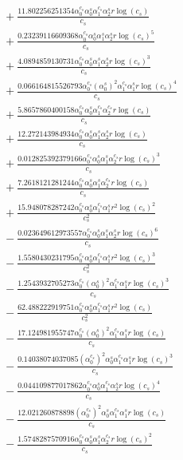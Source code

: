 \documentclass[10pt]{article}
\begin{document}
\begin{align*}
&{}  + \frac{11.802256251354 \alpha_{0}^{c_s} \alpha_{0}^s \alpha_{1}^{c_s} \alpha_{2}^s r \log{\left(c_{s} \right)}}{c_{s}} \\
&{}  + \frac{0.23239116609368 \alpha_{0}^{c_s} \alpha_{0}^s \alpha_{1}^s \alpha_{2}^s r \log{\left(c_{s} \right)}^{5}}{c_{s}} \\
&{}  + \frac{4.0894859130731 \alpha_{0}^{c_s} \alpha_{0}^s \alpha_{1}^s \alpha_{2}^s r \log{\left(c_{s} \right)}^{3}}{c_{s}} \\
&{}  + \frac{0.066164815526793 \alpha_{0}^{c_s} \left(\alpha_{0}^s\right)^{2} \alpha_{1}^{c_s} \alpha_{1}^s r \log{\left(c_{s} \right)}^{4}}{c_{s}} \\
&{}  + \frac{5.8657860400158 \alpha_{0}^{c_s} \alpha_{0}^s \alpha_{1}^{c_s} \alpha_{2}^{c_s} r \log{\left(c_{s} \right)}}{c_{s}} \\
&{}  + \frac{12.272143984934 \alpha_{0}^{c_s} \alpha_{0}^s \alpha_{1}^s \alpha_{2}^s r \log{\left(c_{s} \right)}}{c_{s}} \\
&{}  + \frac{0.012825392379166 \alpha_{0}^{c_s} \alpha_{0}^s \alpha_{1}^s \alpha_{2}^{c_s} r \log{\left(c_{s} \right)}^{3}}{c_{s}} \\
&{}  + \frac{7.2618121281244 \alpha_{0}^{c_s} \alpha_{0}^s \alpha_{1}^s \alpha_{2}^{c_s} r \log{\left(c_{s} \right)}}{c_{s}} \\
&{}  + \frac{15.948078287242 \alpha_{0}^{c_s} \alpha_{0}^s \alpha_{1}^{c_s} \alpha_{1}^s r^{2} \log{\left(c_{s} \right)}^{2}}{c_{s}^{2}} \\
&{}  - \frac{0.023649612973557 \alpha_{0}^{c_s} \alpha_{0}^s \alpha_{1}^s \alpha_{2}^s r \log{\left(c_{s} \right)}^{6}}{c_{s}} \\
&{}  - \frac{1.5580430231795 \alpha_{0}^{c_s} \alpha_{0}^s \alpha_{1}^{c_s} \alpha_{1}^s r^{2} \log{\left(c_{s} \right)}^{3}}{c_{s}^{2}} \\
&{}  - \frac{1.2543932705273 \alpha_{0}^{c_s} \left(\alpha_{0}^s\right)^{2} \alpha_{1}^{c_s} \alpha_{1}^s r \log{\left(c_{s} \right)}^{3}}{c_{s}} \\
&{}  - \frac{62.488222919751 \alpha_{0}^{c_s} \alpha_{0}^s \alpha_{1}^{c_s} \alpha_{1}^s r^{2} \log{\left(c_{s} \right)}}{c_{s}^{2}} \\
&{}  - \frac{17.124981955747 \alpha_{0}^{c_s} \left(\alpha_{0}^s\right)^{2} \alpha_{1}^{c_s} \alpha_{1}^s r \log{\left(c_{s} \right)}}{c_{s}} \\
&{}  - \frac{0.14038074037085 \left(\alpha_{0}^{c_s}\right)^{2} \alpha_{0}^s \alpha_{1}^{c_s} \alpha_{1}^s r \log{\left(c_{s} \right)}^{3}}{c_{s}} \\
&{}  - \frac{0.044109877017862 \alpha_{0}^{c_s} \alpha_{0}^s \alpha_{1}^{c_s} \alpha_{2}^s r \log{\left(c_{s} \right)}^{4}}{c_{s}} \\
&{}  - \frac{12.021260878898 \left(\alpha_{0}^{c_s}\right)^{2} \alpha_{0}^s \alpha_{1}^{c_s} \alpha_{1}^s r \log{\left(c_{s} \right)}}{c_{s}} \\
&{}  - \frac{1.5748287570916 \alpha_{0}^{c_s} \alpha_{0}^s \alpha_{1}^s \alpha_{2}^{c_s} r \log{\left(c_{s} \right)}^{2}}{c_{s}}
\end{align*}
\end{document}
